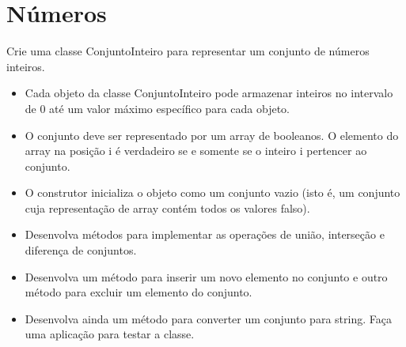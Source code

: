 \documentclass[12pt,a4paper, brazil]{article}
\begin{document}
\dotfill

\section{Números}
\par
Crie uma classe ConjuntoInteiro para representar um conjunto de números inteiros.
\\
\begin{itemize}
    \item Cada objeto da classe ConjuntoInteiro pode armazenar inteiros no intervalo de 0 até um valor máximo específico para cada objeto. 
    \item O conjunto deve ser representado por um array de booleanos. O elemento do array na posição i é verdadeiro se e somente se o inteiro i pertencer ao conjunto.
    \item O construtor inicializa o objeto como um conjunto vazio (isto é, um conjunto cuja representação de array contém todos os valores falso).
    \item Desenvolva métodos para implementar as operações de união, interseção e diferença de conjuntos.
    \item Desenvolva um método para inserir um novo elemento no conjunto e outro método para excluir um elemento do conjunto.
    \item Desenvolva ainda um método para converter um conjunto para string. Faça uma aplicação para testar a classe.
\end{itemize}


\dotfill
\end{document}
